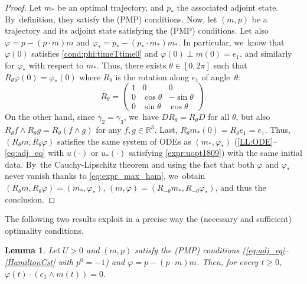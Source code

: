 \documentclass[10pt]{amsart}
\newtheorem{lemma}[theorem]{Lemma}
\theoremstyle{definition}
\begin{document}
\begin{proof}
Let $m_*$ be an optimal trajectory, and $p_*$ the associated adjoint state. By~definition, they satisfy the (PMP) conditions. Now, let $(m, p)$ be a trajectory and its adjoint state satisfying the (PMP) conditions. Let also $\varphi = p - (p \cdot m) m$ and $\varphi_* = p_* - (p_* \cdot m_*) m_*$. In particular, we~know that $\varphi (0)$ satisfies \eqref{cond:phi:timeTtime0} and $\varphi (0) \perp m (0) = e_1$, and similarly for $\varphi_*$ with respect to $m_*$. Thus, there exists $\theta \in [0, 2 \pi]$ such that $R_\theta \varphi (0) = \varphi_* (0)$ where $R_\theta$ is the rotation along $e_1$ of angle~$\theta$:
\begin{equation*}
R_\theta =
\begin{pmatrix}
1 & 0 & 0 \\
0 & \cos \theta & - \sin \theta \\
0 & \sin \theta & \cos \theta
\end{pmatrix}.
\end{equation*}
On the other hand, since $\gamma_2 = \gamma_3$, we~have $D R_\theta = R_\theta D$ for all $\theta$, but also $R_\theta f \wedge R_\theta g = R_\theta (f \wedge g)$ for any $f, g \in \mathbb{R}^3$. Last, $R_\theta m_* (0) = R_\theta e_1 = e_1$. Thus, $(R_\theta m, R_\theta \varphi)$ satisfies the same system of ODEs as $(m_*, \varphi_*)$ (\ie \eqref{LL:ODE}--\eqref{eq:adj_eq} with $u (\cdot)$ or $u_* (\cdot)$ satisfying \eqref{expr:uopt1809}) with the same initial data. By~the Cauchy-Lipschitz theorem and using the fact that both $\varphi$ and $\varphi_*$ never vanish thanks to \eqref{eq:expr_max_ham}, we~obtain $(R_\theta m, R_\theta \varphi) = (m_*, \varphi_*)$, \ie $(m, \varphi) = (R_{- \theta} m_*, R_{- \theta} \varphi_*)$, and thus the conclusion.
\end{proof}

The following two results exploit in a precise way the (necessary and sufficient) optimality conditions.

\begin{lemma} \label{lem:adjoint_dir}
Let $U > 0$ and $(m, p)$ satisfy the (PMP) conditions (\eqref{eq:adj_eq}--\eqref{HamiltonCst} with $p^0 = -1$) and $\varphi = p - (p \cdot m) m$. Then, for every $t \geq 0$, $\varphi (t) \cdot (e_1 \wedge m (t)) = 0$.
\end{lemma}
\end{document}
